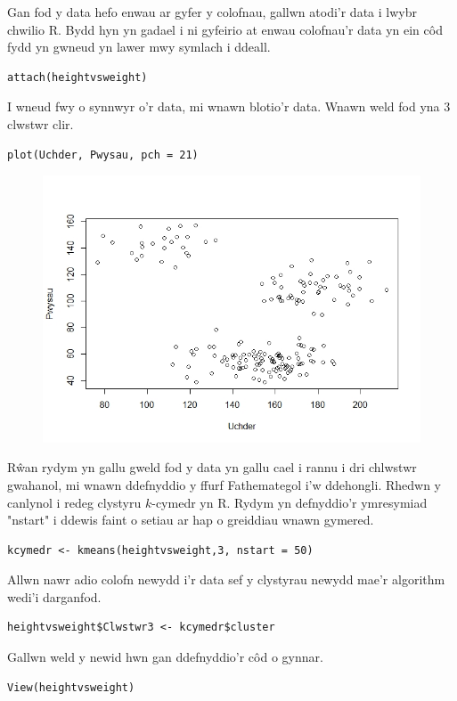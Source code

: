 Gan fod y data hefo enwau ar gyfer y colofnau, gallwn atodi'r data i lwybr chwilio R. Bydd hyn yn gadael i ni gyfeirio at enwau colofnau'r data yn ein c\^{o}d fydd yn gwneud yn lawer mwy symlach i ddeall.

\begin{verbatim}
attach(heightvsweight)
\end{verbatim}

I wneud fwy o synnwyr o'r data, mi wnawn blotio'r data. Wnawn weld fod yna 3 clwstwr clir. 

\begin{verbatim}
plot(Uchder, Pwysau, pch = 21)
\end{verbatim}

\begin{figure}[H]
\includegraphics[width=0.5\linewidth]{../img/ScatterplotR.jpeg}
\label{fig:ScatterplotR}
\end{figure}

R\^{w}an rydym yn gallu gweld fod y data yn gallu cael i rannu i dri chlwstwr gwahanol, mi wnawn ddefnyddio y ffurf Fathemategol i'w ddehongli. Rhedwn y canlynol i redeg clystyru $k$-cymedr yn R. Rydym yn defnyddio'r ymresymiad "nstart" i ddewis faint o setiau ar hap o greiddiau wnawn gymered.

\begin{verbatim}
kcymedr <- kmeans(heightvsweight,3, nstart = 50)
\end{verbatim}

Allwn nawr adio colofn newydd i'r data sef y clystyrau newydd mae'r algorithm wedi'i darganfod.

\begin{verbatim}
heightvsweight$Clwstwr3 <- kcymedr$cluster
\end{verbatim}

Gallwn weld y newid hwn gan ddefnyddio'r c\^{o}d o gynnar.

\begin{verbatim}
View(heightvsweight)
\end{verbatim}

